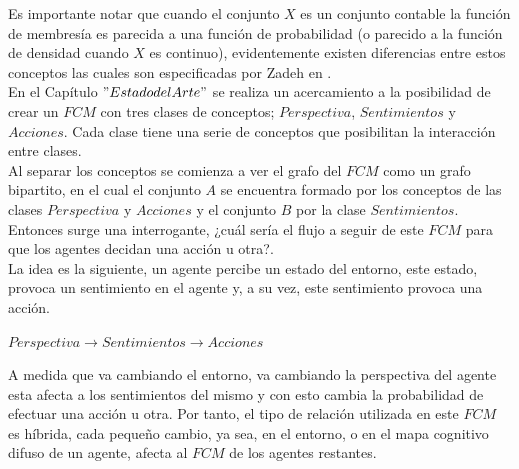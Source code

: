 Es importante notar que cuando el conjunto $X$ es un conjunto contable la función de membresía es parecida a una 
función de probabilidad (o parecido a la función de densidad cuando $X$ es continuo), evidentemente existen
diferencias entre estos conceptos las cuales son especificadas por Zadeh en \autocite{Zadeh1965}.\\


En el Capítulo $"Estado del Arte"$ se realiza un acercamiento a la posibilidad de crear un $FCM$ con tres clases de 
conceptos; $Perspectiva$, $Sentimientos$ y $Acciones$. Cada clase tiene una serie de conceptos que posibilitan la 
interacción entre clases.\\
Al separar los conceptos se comienza a ver el grafo del $FCM$ como un grafo bipartito, en el cual el conjunto $A$
se encuentra formado por los conceptos de las clases $Perspectiva$ y $Acciones$ y el conjunto $B$ por la clase
$Sentimientos$. Entonces surge una interrogante, ¿cuál sería el flujo a seguir de este $FCM$ para que los agentes
decidan una acción u otra?.\\
La idea es la siguiente, un agente percibe un estado del entorno, este estado, provoca un sentimiento en el agente
y, a su vez, este sentimiento provoca una acción.\\
\begin{center}
    $Perspectiva \rightarrow Sentimientos \rightarrow Acciones$
\end{center}

A medida que va cambiando el entorno, va cambiando la perspectiva del agente esta afecta a los sentimientos del mismo 
y con esto cambia la probabilidad de efectuar una acción u otra. Por tanto, el tipo de relación utilizada en este $FCM$
es híbrida, cada pequeño cambio, ya sea, en el entorno, o en el mapa cognitivo difuso de un agente, afecta al $FCM$ de los
agentes restantes.\\

